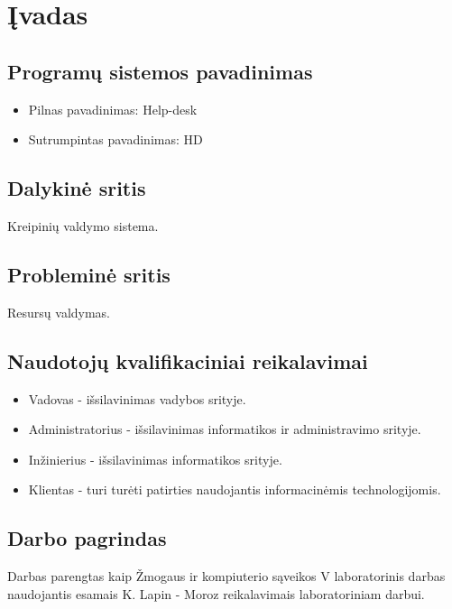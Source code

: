 \section{Įvadas}
	
	\subsection{Programų sistemos pavadinimas}
	
	\begin{itemize}
	\item Pilnas pavadinimas: Help-desk
	\item Sutrumpintas pavadinimas: HD
	\end{itemize}
	
	\subsection{Dalykinė sritis}
	
	Kreipinių valdymo sistema.
	
	\subsection{Probleminė sritis}
	
	Resursų valdymas.
	
	\subsection{Naudotojų kvalifikaciniai reikalavimai}
	
	\begin{itemize}
	\item Vadovas - išsilavinimas vadybos srityje.
	\item Administratorius - išsilavinimas informatikos ir administravimo srityje.
	\item Inžinierius - išsilavinimas informatikos srityje.
	\item Klientas - turi turėti patirties naudojantis informacinėmis technologijomis.
	\end{itemize}
	
	\subsection{Darbo pagrindas}
	
	Darbas parengtas kaip Žmogaus ir kompiuterio sąveikos V laboratorinis darbas naudojantis esamais K. Lapin - Moroz reikalavimais laboratoriniam darbui.
	
